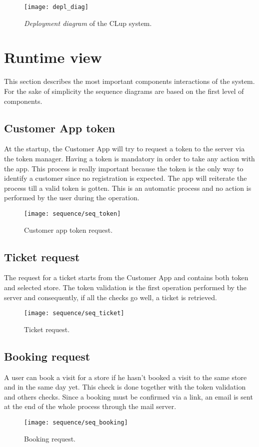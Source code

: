 \begin{figure}[H]
	\centering
	\texttt{[image: depl\_diag]}
	\caption{\textit{Deployment diagram} of the CLup system.}
	\label{fig:depl_diag}
\end{figure}
\clearpage

\section{Runtime view}
This section describes the most important components interactions of the system.\newline
For the sake of simplicity the sequence diagrams are based on the first level of components. 
\subsection{Customer App token}
At the startup, the Customer App will try to request a token to the server via the token manager. Having a token is mandatory in order to take any action with the app.\newline
This process is really important because the token is the only way to identify a customer since no registration is expected. The app will reiterate the process till a valid token is gotten.\newline
This is an automatic process and no action is performed by the user during the operation.
\begin{figure}[H]
	\centering
	\texttt{[image: sequence/seq\_token]}
	\caption{Customer app token request.}
	\label{fig:seq_token}
\end{figure}
\clearpage

\subsection{Ticket request}
The request for a ticket starts from the Customer App and contains both token and selected store. The token validation is the first operation performed by the server and consequently, if all the checks go well, a ticket is retrieved.
\vspace{0.1cm}
\begin{figure}[H]
	\centering
	\texttt{[image: sequence/seq\_ticket]}
	\caption{Ticket request.}
	\label{fig:seq_ticket}
\end{figure}

\clearpage

\subsection{Booking request}
A user can book a visit for a store if he hasn't booked a visit to the same store and in the same day yet. This check is done together with the token validation and others checks.\newline
Since a booking must be confirmed via a link, an email is sent at the end of the whole process through the mail server.
\begin{figure}[H]
	\centering
	\texttt{[image: sequence/seq\_booking]}
	\caption{Booking request.}
	\label{fig:seq_booking}
\end{figure}

